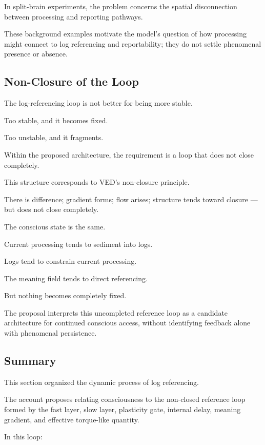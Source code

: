 In split-brain experiments, the problem concerns the spatial disconnection between processing and reporting pathways.

These background examples motivate the model's question of how processing might connect to log referencing and reportability; they do not settle phenomenal presence or absence.

\subsection{Non-Closure of the Loop}


The log-referencing loop is not better for being more stable.

Too stable, and it becomes fixed.

Too unstable, and it fragments.

Within the proposed architecture, the requirement is a loop that does not close completely.

This structure corresponds to VED's non-closure principle.

There is difference; gradient forms; flow arises; structure tends toward closure — but does not close completely.

The conscious state is the same.

Current processing tends to sediment into logs.

Logs tend to constrain current processing.

The meaning field tends to direct referencing.

But nothing becomes completely fixed.

The proposal interprets this uncompleted reference loop as a candidate architecture for continued conscious access, without identifying feedback alone with phenomenal persistence.

\subsection{Summary}


This section organized the dynamic process of log referencing.

The account proposes relating consciousness to the non-closed reference loop formed by the fast layer, slow layer, plasticity gate, internal delay, meaning gradient, and effective torque-like quantity.

In this loop:

